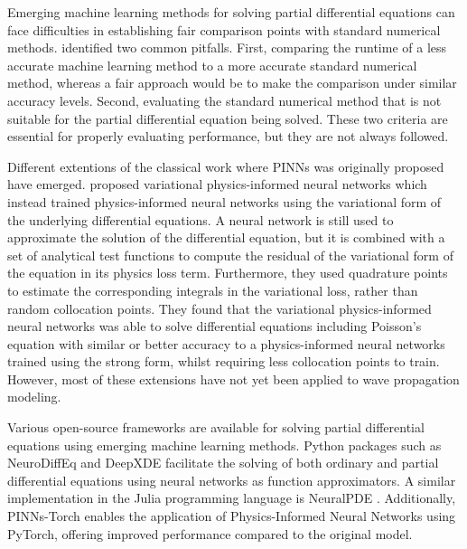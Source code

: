 \documentclass[11pt,twoside]{article}
\begin{document}
Emerging machine learning methods for solving partial differential equations can face difficulties in establishing fair comparison points 
with standard numerical methods. \citeauthor{mcgreivy_weak_2024} identified two common pitfalls. First, comparing the runtime of a less 
accurate machine learning method to a more accurate standard numerical method, whereas a fair approach would be to make the comparison under 
similar accuracy levels. Second, evaluating the standard numerical method that is not suitable for the partial differential equation being 
solved. These two criteria are essential for properly evaluating performance, but they are not always followed. 
 
Different extentions of the classical work where PINNs was originally proposed have emerged.  
proposed variational physics-informed neural networks which instead trained physics-informed neural networks using the variational form of the 
underlying differential equations. A neural network is still used to approximate the solution of the differential equation, but it is combined 
with a set of analytical test functions to compute the residual of the variational form of the equation in its physics loss term. Furthermore, 
they used quadrature points to estimate the corresponding integrals in the variational loss, rather than random collocation points. They found 
that the variational physics-informed neural networks was able to solve differential equations including Poisson’s equation with similar or 
better accuracy to a physics-informed neural networks trained using the strong form, whilst requiring less collocation points to train. 
However, most of these extensions have not yet been applied to wave propagation modeling.

Various open-source frameworks are available for solving partial differential equations using emerging machine learning methods. Python 
packages such as NeuroDiffEq \citep{chen2020neurodiffeq} and DeepXDE \citep{lu2021deepxde} facilitate the solving of both ordinary and 
partial differential equations using neural networks as function approximators. A similar implementation in the Julia programming language 
is NeuralPDE \citep{https://doi.org/10.48550/arxiv.2107.09443}. Additionally, PINNs-Torch \citep{bafghi_pinns-torch_2023} enables the 
application of Physics-Informed Neural Networks using PyTorch, offering improved performance compared to the original model.

\end{document}
